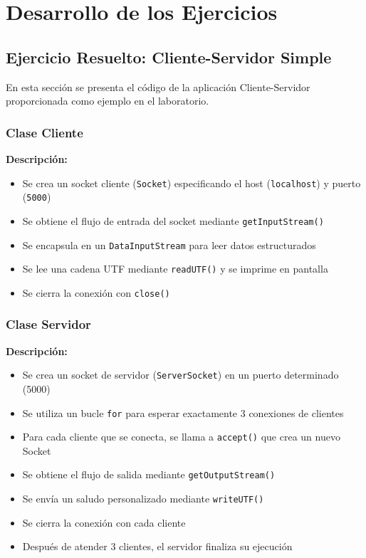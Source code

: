 \documentclass{article}
\begin{document}
\section{Desarrollo de los Ejercicios}

\subsection{Ejercicio Resuelto: Cliente-Servidor Simple}

En esta sección se presenta el código de la aplicación Cliente-Servidor proporcionada como ejemplo en el laboratorio.

\subsubsection{Clase Cliente}



\textbf{Descripción:}
\begin{itemize}
    \item Se crea un socket cliente (\texttt{Socket}) especificando el host (\texttt{localhost}) y puerto (\texttt{5000})
    \item Se obtiene el flujo de entrada del socket mediante \texttt{getInputStream()}
    \item Se encapsula en un \texttt{DataInputStream} para leer datos estructurados
    \item Se lee una cadena UTF mediante \texttt{readUTF()} y se imprime en pantalla
    \item Se cierra la conexión con \texttt{close()}
\end{itemize}

\subsubsection{Clase Servidor}



\textbf{Descripción:}
\begin{itemize}
    \item Se crea un socket de servidor (\texttt{ServerSocket}) en un puerto determinado (5000)
    \item Se utiliza un bucle \texttt{for} para esperar exactamente 3 conexiones de clientes
    \item Para cada cliente que se conecta, se llama a \texttt{accept()} que crea un nuevo Socket
    \item Se obtiene el flujo de salida mediante \texttt{getOutputStream()}
    \item Se envía un saludo personalizado mediante \texttt{writeUTF()}
    \item Se cierra la conexión con cada cliente
    \item Después de atender 3 clientes, el servidor finaliza su ejecución
\end{itemize}
\end{document}
